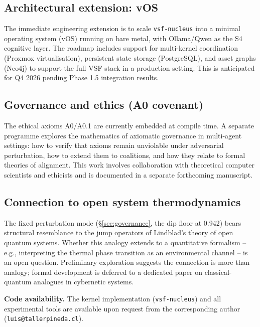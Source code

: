 \documentclass[11pt, a4paper]{article}
\newcommand{\nucleus}{\texttt{vsf-nucleus}}
\begin{document}
\subsection*{Architectural extension: vOS}

The immediate engineering extension is to scale \nucleus{} into a
minimal operating system (vOS) running on bare metal, with Ollama/Qwen
as the S4 cognitive layer.
The roadmap includes support for multi-kernel coordination (Proxmox
virtualisation), persistent state storage (PostgreSQL), and asset
graphs (Neo4j) to support the full VSF stack in a production setting.
This is anticipated for Q4 2026 pending Phase 1.5 integration results.

\subsection*{Governance and ethics (A0 covenant)}

The ethical axioms A0/A0.1 are currently embedded at compile time.
A separate programme explores the mathematics of axiomatic governance
in multi-agent settings: how to verify that axioms remain unviolable
under adversarial perturbation, how to extend them to coalitions,
and how they relate to formal theories of alignment.
This work involves collaboration with theoretical computer scientists
and ethicists and is documented in a separate forthcoming manuscript.

\subsection*{Connection to open system thermodynamics}

The fixed perturbation mode (§\ref{sec:governance}, the dip floor at 0.942)
bears structural resemblance to the jump operators of Lindblad's theory
of open quantum systems.
Whether this analogy extends to a quantitative formalism -- e.g.,
interpreting the thermal phase transition as an environmental channel --
is an open question.
Preliminary exploration suggests the connection is more than analogy;
formal development is deferred to a dedicated paper on classical-quantum
analogues in cybernetic systems.

\bigskip
\noindent\textbf{Code availability.}
The kernel implementation (\nucleus{}) and all experimental tools are
available upon request from the corresponding author (\texttt{luis@tallerpineda.cl}).


\end{document}
